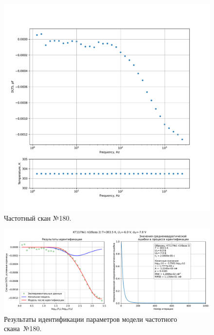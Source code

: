 \begin{figure}[!ht]
    \centering
    \includegraphics[width=1\textwidth]{../plots/КТ117№1_п1(база 2)_2500Гц-1Гц_1пФ_+30С_-6В-7В_20мВ_20мкс_шаг_0,1.pdf}
    \caption{Частотный скан №180.}
    \label{pic:frequency_scan_180}
\end{figure}

\begin{figure}[!ht]
    \centering
    \includegraphics[width=1\textwidth]{../plots/КТ117№1_п1(база 2)_2500Гц-1Гц_1пФ_+30С_-6В-7В_20мВ_20мкс_шаг_0,1_model.pdf}
    \caption{Результаты идентификации параметров модели частотного скана~№180.}
    \label{pic:frequency_scan_model180}
\end{figure}

\pagebreak


